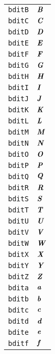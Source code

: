 \begin{longtable}{ll}
\texttt{bditB}&${}{\textbf{\textit{B}}}{}$\\
\texttt{bditC}&${}{\textbf{\textit{C}}}{}$\\
\texttt{bditD}&${}{\textbf{\textit{D}}}{}$\\
\texttt{bditE}&${}{\textbf{\textit{E}}}{}$\\
\texttt{bditF}&${}{\textbf{\textit{F}}}{}$\\
\texttt{bditG}&${}{\textbf{\textit{G}}}{}$\\
\texttt{bditH}&${}{\textbf{\textit{H}}}{}$\\
\texttt{bditI}&${}{\textbf{\textit{I}}}{}$\\
\texttt{bditJ}&${}{\textbf{\textit{J}}}{}$\\
\texttt{bditK}&${}{\textbf{\textit{K}}}{}$\\
\texttt{bditL}&${}{\textbf{\textit{L}}}{}$\\
\texttt{bditM}&${}{\textbf{\textit{M}}}{}$\\
\texttt{bditN}&${}{\textbf{\textit{N}}}{}$\\
\texttt{bditO}&${}{\textbf{\textit{O}}}{}$\\
\texttt{bditP}&${}{\textbf{\textit{P}}}{}$\\
\texttt{bditQ}&${}{\textbf{\textit{Q}}}{}$\\
\texttt{bditR}&${}{\textbf{\textit{R}}}{}$\\
\texttt{bditS}&${}{\textbf{\textit{S}}}{}$\\
\texttt{bditT}&${}{\textbf{\textit{T}}}{}$\\
\texttt{bditU}&${}{\textbf{\textit{U}}}{}$\\
\texttt{bditV}&${}{\textbf{\textit{V}}}{}$\\
\texttt{bditW}&${}{\textbf{\textit{W}}}{}$\\
\texttt{bditX}&${}{\textbf{\textit{X}}}{}$\\
\texttt{bditY}&${}{\textbf{\textit{Y}}}{}$\\
\texttt{bditZ}&${}{\textbf{\textit{Z}}}{}$\\
\texttt{bdita}&${}{\textbf{\textit{a}}}{}$\\
\texttt{bditb}&${}{\textbf{\textit{b}}}{}$\\
\texttt{bditc}&${}{\textbf{\textit{c}}}{}$\\
\texttt{bditd}&${}{\textbf{\textit{d}}}{}$\\
\texttt{bdite}&${}{\textbf{\textit{e}}}{}$\\
\texttt{bditf}&${}{\textbf{\textit{f}}}{}$\\

\end{longtable}
